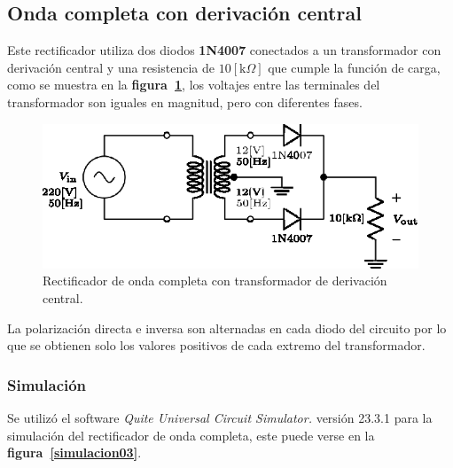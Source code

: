 \subsection{Onda completa con derivación central}
Este rectificador utiliza dos diodos \textbf{1N4007} conectados a un
transformador con derivación central y una resistencia de $10[\text{k}\Omega]$
que cumple la función de carga, como se muestra en la
\textbf{figura~\ref{circuito03}}, los voltajes entre las terminales del
transformador son iguales en magnitud, pero con diferentes fases.

\begin{figure}[!h]
\centering
\includegraphics[scale=1.1]{diagramas/03.derivacion_central1.eps}
\caption{Rectificador de onda completa con transformador de derivación central.}
\label{circuito03}
\end{figure}

La polarización directa e inversa son alternadas en cada diodo del circuito por
lo que se obtienen solo los valores positivos de cada extremo del transformador.

\subsubsection{Simulación}
Se utilizó el software \emph{Quite Universal Circuit Simulator.} versión 23.3.1
para la simulación del rectificador de onda completa, este puede verse en la
\textbf{figura~\ref{simulacion03}}.


